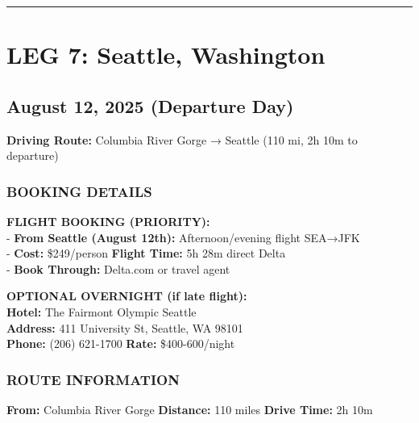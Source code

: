 \documentclass[
  11pt,
]{article}
\begin{document}
\begin{center}\rule{0.5\linewidth}{0.5pt}\end{center}

\newpage

\section{\texorpdfstring{\textcolor{primary}{LEG 7: Seattle, Washington}}{}}\label{section-46}

\subsection{\texorpdfstring{\textcolor{secondary}{August 12, 2025 (Departure Day)}}{}}\label{section-47}

\textbf{\textcolor{secondary}{Driving Route:}} Columbia River Gorge →
Seattle (110 mi, 2h 10m to departure)

\subsubsection{\texorpdfstring{\textcolor{primary}{BOOKING DETAILS}}{}}\label{section-48}

\textbf{\textcolor{secondary}{FLIGHT BOOKING (PRIORITY):}}\\
- \textbf{\textcolor{secondary}{From Seattle (August 12th):}}
Afternoon/evening flight SEA→JFK\\
- \textbf{\textcolor{secondary}{Cost:}} \$249/person \textbar{}
\textbf{\textcolor{secondary}{Flight Time:}} 5h 28m direct Delta\\
- \textbf{\textcolor{secondary}{Book Through:}} Delta.com or travel
agent

\textbf{\textcolor{secondary}{OPTIONAL OVERNIGHT (if late flight):}}\\
\textbf{\textcolor{secondary}{Hotel:}} The Fairmont Olympic Seattle\\
\textbf{\textcolor{secondary}{Address:}} 411 University St, Seattle, WA
98101\\
\textbf{\textcolor{secondary}{Phone:}} (206) 621-1700 \textbar{}
\textbf{\textcolor{secondary}{Rate:}} \$400-600/night

\subsubsection{\texorpdfstring{\textcolor{primary}{ROUTE INFORMATION}}{}}\label{section-49}

\textbf{\textcolor{secondary}{From:}} Columbia River Gorge \textbar{}
\textbf{\textcolor{secondary}{Distance:}} 110 miles \textbar{}
\textbf{\textcolor{secondary}{Drive Time:}} 2h 10m
\end{document}
